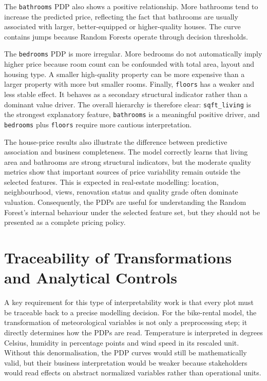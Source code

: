 \documentclass[
]{article}
\begin{document}
The \texttt{bathrooms} PDP also shows a positive relationship. More bathrooms tend to increase the predicted price, reflecting the fact that bathrooms are usually associated with larger, better-equipped or higher-quality houses. The curve contains jumps because Random Forests operate through decision thresholds.

The \texttt{bedrooms} PDP is more irregular. More bedrooms do not automatically imply higher price because room count can be confounded with total area, layout and housing type. A smaller high-quality property can be more expensive than a larger property with more but smaller rooms. Finally, \texttt{floors} has a weaker and less stable effect. It behaves as a secondary structural indicator rather than a dominant value driver. The overall hierarchy is therefore clear: \texttt{sqft\_living} is the strongest explanatory feature, \texttt{bathrooms} is a meaningful positive driver, and \texttt{bedrooms} plus \texttt{floors} require more cautious interpretation.

The house-price results also illustrate the difference between predictive association and business completeness. The model correctly learns that living area and bathrooms are strong structural indicators, but the moderate quality metrics show that important sources of price variability remain outside the selected features. This is expected in real-estate modelling: location, neighbourhood, views, renovation status and quality grade often dominate valuation. Consequently, the PDPs are useful for understanding the Random Forest's internal behaviour under the selected feature set, but they should not be presented as a complete pricing policy.

\section{Traceability of Transformations and Analytical Controls}
\label{traceability-transformations-and-analytical-controls}

A key requirement for this type of interpretability work is that every plot must be traceable back to a precise modelling decision. For the bike-rental model, the transformation of meteorological variables is not only a preprocessing step; it directly determines how the PDPs are read. Temperature is interpreted in degrees Celsius, humidity in percentage points and wind speed in its rescaled unit. Without this denormalisation, the PDP curves would still be mathematically valid, but their business interpretation would be weaker because stakeholders would read effects on abstract normalized variables rather than operational units.
\end{document}
